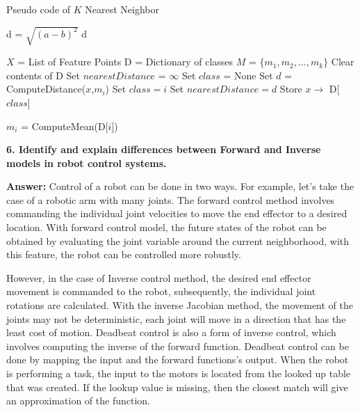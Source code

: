 \documentclass[a4paper, 10pt]{article}
\begin{document}
\begin{algorithm}
	\caption{Pseudo code of $K$ Nearest Neighbor}
	\label{alg:knn}
	\begin{algorithmic}[1]
			\State d = $\sqrt{(a-b)^{2}}$
			\State \Return d
		\EndFunction
		
		\State $X$ = List of Feature Points
		\State D = Dictionary of classes 
		\State $M$ = $\{m_{1}, m_{2}, ..., m_{k}\}$ 
			\State Clear contents of D
			 
				\State Set $nearestDistance$ = $\infty$
				\State Set $class$ = None
					\State Set $d$ = ComputeDistance($x$,$m_{i}$)
						\State Set $class = i$
						\State Set $nearestDistance = d$
					\EndIf
				\EndFor
			\State Store $x \rightarrow$ D[$class$]
			\EndFor
			
			\State $m_{i}$ = ComputeMean(D[$i$])
			\EndFor
		\EndFor
	\end{algorithmic}
\end{algorithm}


\hfill

\textbf{6. Identify and explain differences between Forward and Inverse models in robot control systems.}

\textbf{Answer:} Control of a robot can be done in two ways. For example, let's take the case of a robotic arm with many joints. The forward control method involves commanding the individual joint velocities to move the end effector to a desired location. With forward control model, the future states of the robot can be obtained by evaluating the joint variable around the current neighborhood, with this feature, the robot can be controlled more robustly. 

However, in the case of Inverse control method, the desired end effector movement is commanded to the robot, subsequently, the individual joint rotations are calculated. With the inverse Jacobian method, the movement of the joints may not be deterministic, each joint will move in a direction that has the least cost of motion. Deadbeat control is also a form of inverse control, which involves computing the inverse of the forward function. Deadbeat control can be done by mapping the input and the forward functions's output. When the robot is performing a task, the input to the motors is located from the looked up table that was created. If the lookup value is missing, then the closest match will give an approximation of the function.
\end{document}
